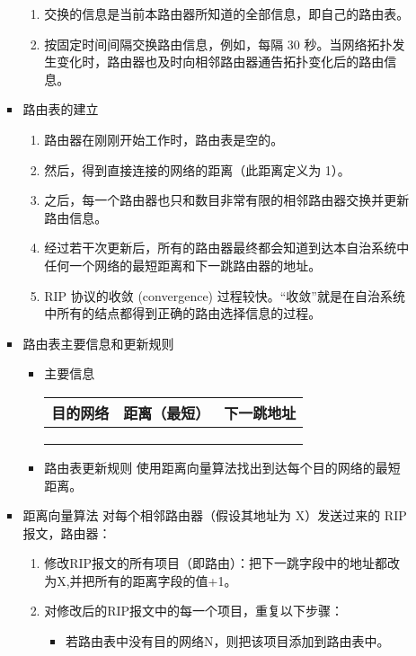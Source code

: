 \documentclass[11pt]{article}
\begin{document}
\begin{enumerate}
\begin{enumerate}
\begin{itemize}
\begin{enumerate}
\item 交换的信息是当前本路由器所知道的全部信息，即自己的路由表。

\item 按固定时间间隔交换路由信息，例如，每隔 30 秒。当网络拓扑发生变化时，路由器也及时向相邻路由器通告拓扑变化后的路由信息。
\end{enumerate}

\item 路由表的建立
\begin{enumerate}
\item 路由器在刚刚开始工作时，路由表是空的。

\item 然后，得到直接连接的网络的距离（此距离定义为 1）。

\item 之后，每一个路由器也只和数目非常有限的相邻路由器交换并更新路由信息。

\item 经过若干次更新后，所有的路由器最终都会知道到达本自治系统中任何一个网络的最短距离和下一跳路由器的地址。

\item RIP 协议的收敛 (convergence) 过程较快。“收敛”就是在自治系统中所有的结点都得到正确的路由选择信息的过程。
\end{enumerate}
\item 路由表主要信息和更新规则
\begin{itemize}
\item 主要信息
\begin{center}
\begin{tabular}{lll}
目的网络 & 距离（最短） & 下一跳地址\\
\hline
 &  & \\
 &  & \\
 &  & \\
\end{tabular}
\end{center}
\item 路由表更新规则
使用距离向量算法找出到达每个目的网络的最短距离。
\end{itemize}

\item 距离向量算法
对每个相邻路由器（假设其地址为 X）发送过来的 RIP 报文，路由器：
\begin{enumerate}
\item 修改RIP报文的所有项目（即路由）：把下一跳字段中的地址都改为X,并把所有的距离字段的值+1。

\item 对修改后的RIP报文中的每一个项目，重复以下步骤：
\begin{itemize}
\item 若路由表中没有目的网络N，则把该项目添加到路由表中。


\end{itemize}
\end{enumerate}
\end{itemize}
\end{enumerate}
\end{enumerate}
\end{document}
